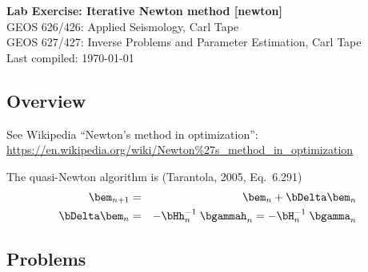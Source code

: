 \documentclass[11pt,titlepage,fleqn]{article}
\begin{document}

\begin{spacing}{1.2}
\centering
{\large \bf Lab Exercise: Iterative Newton method [newton]} \\
GEOS 626/426: Applied Seismology, Carl Tape \\
GEOS 627/427: Inverse Problems and Parameter Estimation, Carl Tape \\
Last compiled: \today
\end{spacing}


\subsection*{Overview}

See Wikipedia ``Newton's method in optimization'': \\
\url{https://en.wikipedia.org/wiki/Newton%27s_method_in_optimization}

The quasi-Newton algorithm is (\eg Tarantola, 2005, Eq.~6.291)
%
\begin{eqnarray}
\bem_{n+1} &=& \bem_n + \bDelta\bem_n
\\
\bDelta\bem_n &=& -\bHh_n^{-1}\; \bgammah_n = -\bH_n^{-1}\; \bgamma_n
\end{eqnarray}


\subsection*{Problems}
\end{document}
